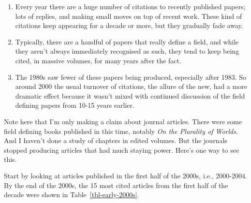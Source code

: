 \documentclass[
  10pt,
  letterpaper,
  DIV=11,
  numbers=noendperiod,
  twoside]{scrartcl}
\providecommand{\tightlist}{%
  \setlength{\itemsep}{0pt}\setlength{\parskip}{0pt}}\usepackage{longtable,booktabs,array}
\begin{document}
\begin{enumerate}
\def\labelenumi{\arabic{enumi}.}
\tightlist
\item
  Every year there are a huge number of citations to recently published
  papers; lots of replies, and making small moves on top of recent work.
  These kind of citations keep appearing for a decade or more, but they
  gradually fade away.
\item
  Typically, there are a handful of papers that really define a field,
  and while they aren't always immediately recognised as such, they tend
  to keep being cited, in massive volumes, for many years after the
  fact.
\item
  The 1980s saw fewer of these papers being produced, especially after
  1983. So around 2000 the usual turnover of citations, the allure of
  the new, had a more dramatic effect because it wasn't mixed with
  continued discussion of the field defining papers from 10-15 years
  earlier.
\end{enumerate}

Note here that I'm only making a claim about journal articles. There
were some field defining books published in this time, notably \emph{On
the Plurality of Worlds}. And I haven't done a study of chapters in
edited volumes. But the journals stopped producing articles that had
much staying power. Here's one way to see this.

Start by looking at articles published in the first half of the 2000s,
i.e., 2000-2004. By the end of the 2000s, the 15 most cited articles
from the first half of the decade were shown in
Table~\ref{tbl-early-2000s}.
\end{document}
